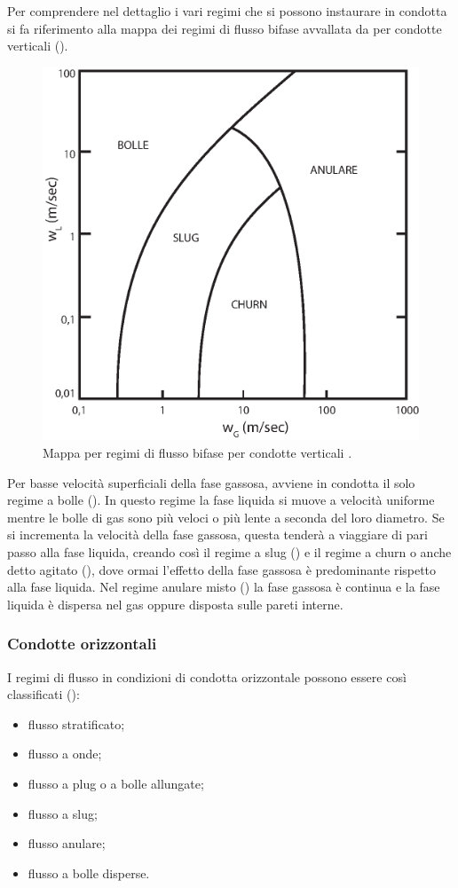 Per comprendere nel dettaglio i vari regimi che si possono instaurare in condotta si fa riferimento alla mappa dei regimi di flusso bifase avvallata da \citeauthor{griffith1984multiphase} per condotte verticali ().

\begin{figure}[htbp]
    \centering
    \includegraphics[width=.6\textwidth]{fig/fluidodinamica/ver-griffith.eps}
    \caption{Mappa per regimi di flusso bifase per condotte verticali \parencite{griffith1984multiphase}.}
    \label{fig:ver-griffith}
\end{figure}

Per basse velocità superficiali della fase gassosa, avviene in condotta il solo regime a bolle (). In questo regime la fase liquida si muove a velocità uniforme mentre le bolle di gas sono più veloci o più lente a seconda del loro diametro. Se si incrementa la velocità della fase gassosa, questa tenderà a viaggiare di pari passo alla fase liquida, creando così il regime a slug () e il regime a churn o anche detto agitato (), dove ormai l'effetto della fase gassosa è predominante rispetto alla fase liquida. Nel regime anulare misto () la fase gassosa è continua e la fase liquida è dispersa nel gas oppure disposta sulle pareti interne.

\subsubsection{Condotte orizzontali}
I regimi di flusso in condizioni di condotta orizzontale possono essere così classificati ():
\begin{itemize} 
    \item flusso stratificato;
    \item flusso a onde;
    \item flusso a plug o a bolle allungate;
    \item flusso a slug;
    \item flusso anulare;
    \item flusso a bolle disperse.
\end{itemize} 

